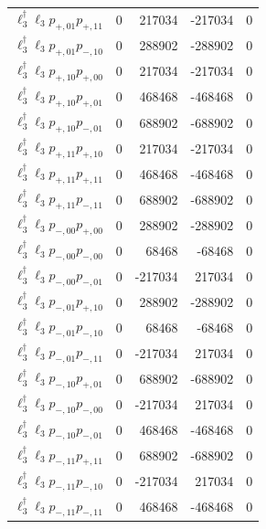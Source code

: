 \begin{longtable}{@{}lrrrr@{}}
$\ell_{3}^\dagger \ell_{3} p_{+,01} p_{+,11}$ & 0 & 217034 & -217034 & 0 \\
$\ell_{3}^\dagger \ell_{3} p_{+,01} p_{-,10}$ & 0 & 288902 & -288902 & 0 \\
$\ell_{3}^\dagger \ell_{3} p_{+,10} p_{+,00}$ & 0 & 217034 & -217034 & 0 \\
$\ell_{3}^\dagger \ell_{3} p_{+,10} p_{+,01}$ & 0 & 468468 & -468468 & 0 \\
$\ell_{3}^\dagger \ell_{3} p_{+,10} p_{-,01}$ & 0 & 688902 & -688902 & 0 \\
$\ell_{3}^\dagger \ell_{3} p_{+,11} p_{+,10}$ & 0 & 217034 & -217034 & 0 \\
$\ell_{3}^\dagger \ell_{3} p_{+,11} p_{+,11}$ & 0 & 468468 & -468468 & 0 \\
$\ell_{3}^\dagger \ell_{3} p_{+,11} p_{-,11}$ & 0 & 688902 & -688902 & 0 \\
$\ell_{3}^\dagger \ell_{3} p_{-,00} p_{+,00}$ & 0 & 288902 & -288902 & 0 \\
$\ell_{3}^\dagger \ell_{3} p_{-,00} p_{-,00}$ & 0 & 68468 & -68468 & 0 \\
$\ell_{3}^\dagger \ell_{3} p_{-,00} p_{-,01}$ & 0 & -217034 & 217034 & 0 \\
$\ell_{3}^\dagger \ell_{3} p_{-,01} p_{+,10}$ & 0 & 288902 & -288902 & 0 \\
$\ell_{3}^\dagger \ell_{3} p_{-,01} p_{-,10}$ & 0 & 68468 & -68468 & 0 \\
$\ell_{3}^\dagger \ell_{3} p_{-,01} p_{-,11}$ & 0 & -217034 & 217034 & 0 \\
$\ell_{3}^\dagger \ell_{3} p_{-,10} p_{+,01}$ & 0 & 688902 & -688902 & 0 \\
$\ell_{3}^\dagger \ell_{3} p_{-,10} p_{-,00}$ & 0 & -217034 & 217034 & 0 \\
$\ell_{3}^\dagger \ell_{3} p_{-,10} p_{-,01}$ & 0 & 468468 & -468468 & 0 \\
$\ell_{3}^\dagger \ell_{3} p_{-,11} p_{+,11}$ & 0 & 688902 & -688902 & 0 \\
$\ell_{3}^\dagger \ell_{3} p_{-,11} p_{-,10}$ & 0 & -217034 & 217034 & 0 \\
$\ell_{3}^\dagger \ell_{3} p_{-,11} p_{-,11}$ & 0 & 468468 & -468468 & 0 \\
\end{longtable}
\endgroup
